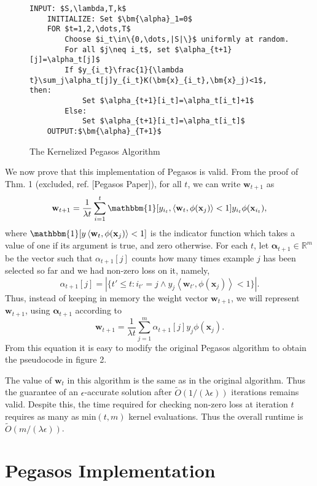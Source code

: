 \documentclass{article}
\begin{document}
\begin{figure}[h]
	\centering
    \begin{lstlisting}[frame=single, mathescape=true]
    INPUT: $S,\lambda,T,k$
    INITIALIZE: Set $\bm{\alpha}_1=0$
    FOR $t=1,2,\dots,T$
    	Choose $i_t\in\{0,\dots,|S|\}$ uniformly at random.
        For all $j\neq i_t$, set $\alpha_{t+1}[j]=\alpha_t[j]$
        If $y_{i_t}\frac{1}{\lambda t}\sum_j\alpha_t[j]y_{i_t}K(\bm{x}_{i_t},\bm{x}_j)<1$, then:
        	Set $\alpha_{t+1}[i_t]=\alpha_t[i_t]+1$
        Else:
        	Set $\alpha_{t+1}[i_t]=\alpha_t[i_t]$
    OUTPUT:$\bm{\alpha}_{T+1}$
    \end{lstlisting}
    \caption{The Kernelized Pegasos Algorithm}
\end{figure}
We now prove that this implementation of Pegasos is valid.
From the proof of Thm. 1 (excluded, ref. [Pegasos Paper]), for all $t$, we can write
$\mathbf{w}_{t+1}$ as
$$\mathbf{w}_{t+1}=\frac{1}{\lambda t}\sum_{i=1}^t\mathbbm{1}[y_{i_t},\left<\mathbf{w}_t,\phi(\mathbf{x}_j)\right><1]y_{i_t}\phi(\mathbf{x}_{i_t}),$$
where $\mathbbm{1}[y\left<\mathbf{w}_t,\phi(\mathbf{x}_j)\right><1]$ is the indicator function
which takes a value of one if its argument is true, and zero otherwise. For each $t$, let
$\mathbf{\alpha}_{t+1}\in \mathbb{R}^m$ be the vector such that $\alpha_{t+1}[j]$ counts how many times
example $j$ has been selected so far and we had non-zero loss on it, namely,
$$\alpha_{t+1}[j]=|\{t'\leq t : i_{t'}=j\land y_j\left<\mathbf{w}_{t'},\phi(\mathbf{x}_j)\right><1\}|.$$
Thus, instead of keeping in memory the weight vector $\mathbf{w}_{t+1}$, we will represent $\mathbf{w}_{t+1}$,
using $\mathbf{\alpha}_{t+1}$ according to
$$\mathbf{w}_{t+1}=\frac{1}{\lambda t}\sum_{j=1}^m\alpha_{t+1}[j]y_j\phi(\mathbf{x}_j).$$
From this equation it is easy to modify the original Pegasos algorithm to obtain the pseudocode in figure 2.

The value of $\mathbf{w}_t$ in this algorithm is the same as in the original algorithm. Thus the guarantee
of an $\epsilon$-accurate solution after $\tilde{O}(1/(\lambda \epsilon))$ iterations remains valid.
Despite this, the time required for checking non-zero loss at iteration $t$ requires as many as min$(t,m)$
kernel evaluations. Thus the overall runtime is $\tilde{O}(m/(\lambda \epsilon))$.
\section{Pegasos Implementation}
\end{document}
